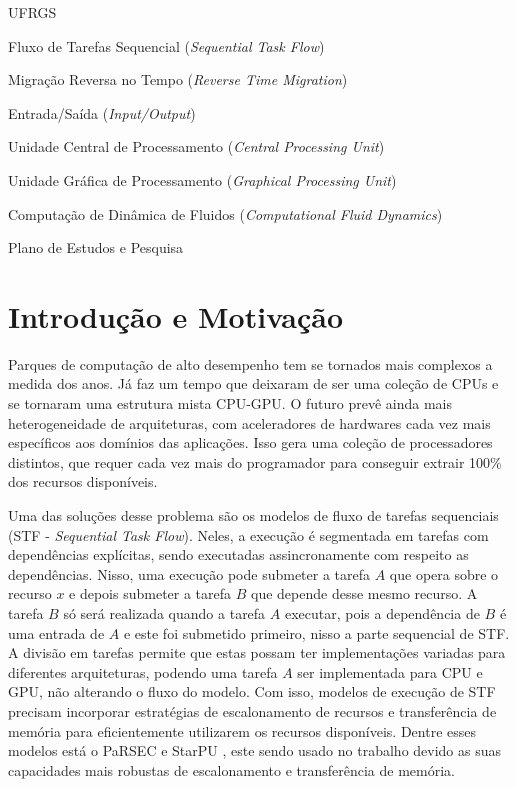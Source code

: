 \documentclass[ppgc,pep]{infufrgs}
\begin{document}
\tableofcontents

\listoffigures

\listoftables

\begin{listofabbrv}{UFRGS}
  \item[STF] Fluxo de Tarefas Sequencial (\textit{Sequential Task Flow})
  \item[RTM]  Migração Reversa no Tempo (\textit{Reverse Time Migration})
  \item[IO] Entrada/Saída (\textit{Input/Output})
  \item[CPU] Unidade Central de Processamento (\textit{Central Processing Unit})
  \item[GPU] Unidade Gráfica de Processamento (\textit{Graphical Processing Unit})
  \item[CFD] Computação de Dinâmica de Fluidos (\textit{Computational Fluid Dynamics}) 
  \item[PEP] Plano de Estudos e Pesquisa
\end{listofabbrv}

\chapter{Introdução e Motivação}
\label{cap:introducao}

Parques de computação de alto desempenho tem se tornados mais complexos a medida dos anos. Já faz um tempo que deixaram de ser uma coleção de CPUs e se tornaram uma estrutura mista CPU-GPU. O futuro prevê ainda mais heterogeneidade de arquiteturas, com aceleradores de hardwares cada vez mais específicos aos domínios das aplicações. Isso gera uma coleção de processadores distintos, que requer cada vez mais do programador para conseguir extrair 100\% dos recursos disponíveis.

Uma das soluções desse problema são os modelos de fluxo de tarefas sequenciais (STF - \textit{Sequential Task Flow}). Neles, a execução é segmentada em tarefas com dependências explícitas, sendo executadas assincronamente com respeito as dependências. Nisso, uma execução pode submeter a tarefa $A$ que opera sobre o recurso $x$ e depois submeter a tarefa $B$ que depende desse mesmo recurso. A tarefa $B$ só será realizada quando a tarefa $A$ executar, pois a dependência de $B$ é uma entrada de $A$ e este foi submetido primeiro, nisso a parte sequencial de STF. A divisão em tarefas permite que estas possam ter implementações variadas para diferentes arquiteturas, podendo uma tarefa $A$ ser implementada para CPU e GPU, não alterando o fluxo do modelo. Com isso, modelos de execução de STF precisam incorporar estratégias de escalonamento de recursos e transferência de memória para eficientemente utilizarem os recursos disponíveis. Dentre esses modelos está o PaRSEC \cite{bosilca_parsec_2013} e StarPU \cite{starpu-paper}, este sendo usado no trabalho devido as suas capacidades mais robustas de escalonamento e transferência de memória. 
\end{document}
